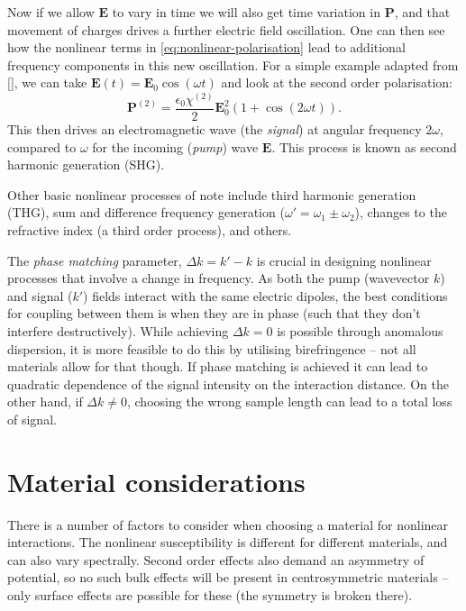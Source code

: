 \documentclass[12pt,a4paper]{article}
\newcommand{\citein}[1]{[\citen{#1}]}
\begin{document}
Now if we allow $\bm{E}$ to vary in time we will also get time variation in $\bm{P}$, and that movement of charges drives a further electric field oscillation. One can then see how the nonlinear terms in \eqref{eq:nonlinear-polarisation} lead to additional frequency components in this new oscillation. For a simple example adapted from \citein{boydNonlinearOptics2008}, we can take $\bm{E}(t)=\bm{E}_0\cos(\omega t)$ and look at the second order polarisation:
\begin{equation}
	\label{eq:example-polarisation}
	\bm{P}^{(2)}=\frac{\epsilon_0\chi^{(2)}}{2}\bm{E}_0^2\left(1+\cos(2\omega t)\right).
\end{equation}
This then drives an electromagnetic wave (the \emph{signal}) at angular frequency $2\omega$, compared to $\omega$ for the incoming (\emph{pump}) wave $\bm{E}$. This process is known as second harmonic generation (SHG).

Other basic nonlinear processes of note include third harmonic generation (THG), sum and difference frequency generation ($\omega'=\omega_1\pm\omega_2$), changes to the refractive index (a third order process), and others\cite{boydNonlinearOptics2008}.

The \emph{phase matching} parameter, $\Delta k = k'-k$ is crucial in designing nonlinear processes that involve a change in frequency\cite{boydNonlinearOptics2008}. As both the pump (wavevector $k$) and signal ($k'$) fields interact with the same electric dipoles, the best conditions for coupling between them is when they are in phase (such that they don't interfere destructively). While achieving $\Delta k=0$ is possible through anomalous dispersion, it is more feasible to do this by utilising birefringence\cite{raoNonlinearFrequencyConversion2004} -- not all materials allow for that though. If phase matching is achieved it can lead to quadratic dependence of the signal intensity on the interaction distance. On the other hand, if $\Delta k\neq 0$, choosing the wrong sample length can lead to a total loss of signal\cite{boydNonlinearOptics2008}.

\section{Material considerations}
There is a number of factors to consider when choosing a material for nonlinear interactions. The nonlinear susceptibility is different for different materials\cite{burnsThirdHarmonicGenerationAbsorbing1971}, and can also vary spectrally\cite{carnemollaDegenerateOpticalNonlinear2018a}. Second order effects also demand an asymmetry of potential, so no such bulk effects will be present in centrosymmetric materials -- only surface effects are possible for these (the symmetry is broken there)\cite{boydNonlinearOptics2008}.
\end{document}
